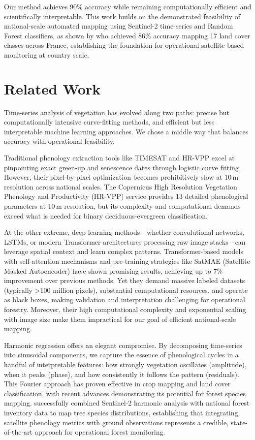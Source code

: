 \documentclass[utf8]{FrontiersinHarvard}
\begin{document}
Our method achieves 90\% accuracy while remaining computationally efficient and scientifically interpretable. This work builds on the demonstrated feasibility of national-scale automated mapping using Sentinel-2 time-series and Random Forest classifiers, as shown by \citet{Inglada2017} who achieved 86\% accuracy mapping 17 land cover classes across France, establishing the foundation for operational satellite-based monitoring at country scale.

\section{Related Work}

Time-series analysis of vegetation has evolved along two paths: precise but computationally intensive curve-fitting methods, and efficient but less interpretable machine learning approaches. We chose a middle way that balances accuracy with operational feasibility.

Traditional phenology extraction tools like TIMESAT and HR-VPP excel at pinpointing exact green-up and senescence dates through logistic curve fitting \citep{JonssonEklundh2002, EU2024b}. However, their pixel-by-pixel optimization becomes prohibitively slow at 10\,m resolution across national scales. The Copernicus High Resolution Vegetation Phenology and Productivity (HR-VPP) service provides 13 detailed phenological parameters at 10\,m resolution, but its complexity and computational demands exceed what is needed for binary deciduous-evergreen classification.

At the other extreme, deep learning methods—whether convolutional networks, LSTMs, or modern Transformer architectures processing raw image stacks—can leverage spatial context and learn complex patterns. Transformer-based models with self-attention mechanisms and pre-training strategies like SatMAE (Satellite Masked Autoencoder) \citep{Cong2022} have shown promising results, achieving up to 7\% improvement over previous methods. Yet they demand massive labeled datasets (typically >100 million pixels), substantial computational resources, and operate as black boxes, making validation and interpretation challenging for operational forestry. Moreover, their high computational complexity and exponential scaling with image size make them impractical for our goal of efficient national-scale mapping.

Harmonic regression offers an elegant compromise. By decomposing time-series into sinusoidal components, we capture the essence of phenological cycles in a handful of interpretable features: how strongly vegetation oscillates (amplitude), when it peaks (phase), and how consistently it follows the pattern (residuals). This Fourier approach has proven effective in crop mapping and land cover classification, with recent advances demonstrating its potential for forest species mapping. \citet{Francini2024} successfully combined Sentinel-2 harmonic analysis with national forest inventory data to map tree species distributions, establishing that integrating satellite phenology metrics with ground observations represents a credible, state-of-the-art approach for operational forest monitoring.
\end{document}
